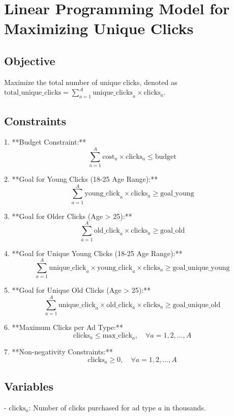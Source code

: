\documentclass{article}
\begin{document}
\section*{Linear Programming Model for Maximizing Unique Clicks}

\subsection*{Objective}
Maximize the total number of unique clicks, denoted as \( \text{total\_unique\_clicks} = \sum_{a=1}^{A} \text{unique\_clicks}_{a} \times \text{clicks}_{a} \).

\subsection*{Constraints}

1. **Budget Constraint:**
   \[
   \sum_{a=1}^{A} \text{cost}_{a} \times \text{clicks}_{a} \leq \text{budget}
   \]

2. **Goal for Young Clicks (18-25 Age Range):**
   \[
   \sum_{a=1}^{A} \text{young\_click}_{a} \times \text{clicks}_{a} \geq \text{goal\_young}
   \]

3. **Goal for Older Clicks (Age > 25):**
   \[
   \sum_{a=1}^{A} \text{old\_click}_{a} \times \text{clicks}_{a} \geq \text{goal\_old}
   \]

4. **Goal for Unique Young Clicks (18-25 Age Range):**
   \[
   \sum_{a=1}^{A} \text{unique\_click}_{a} \times \text{young\_click}_{a} \times \text{clicks}_{a} \geq \text{goal\_unique\_young}
   \]

5. **Goal for Unique Old Clicks (Age > 25):**
   \[
   \sum_{a=1}^{A} \text{unique\_click}_{a} \times \text{old\_click}_{a} \times \text{clicks}_{a} \geq \text{goal\_unique\_old}
   \]

6. **Maximum Clicks per Ad Type:**
   \[
   \text{clicks}_{a} \leq \text{max\_click}_{a}, \quad \forall a = 1, 2, \ldots, A
   \]

7. **Non-negativity Constraints:**
   \[
   \text{clicks}_{a} \geq 0, \quad \forall a = 1, 2, \ldots, A
   \]

\subsection*{Variables}
- \( \text{clicks}_{a} \): Number of clicks purchased for ad type \( a \) in thousands.
\end{document}
